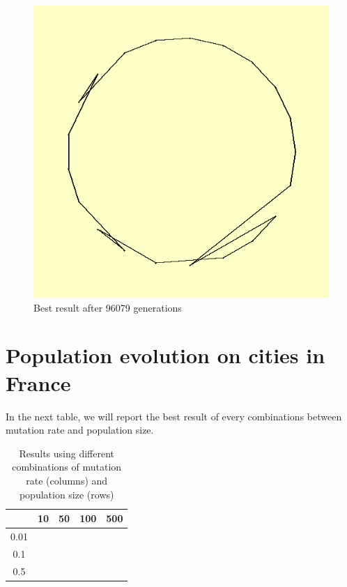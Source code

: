 \documentclass{article}
\begin{document}
\begin{figure}[!ht]
\includegraphics[width=\textwidth]{../result/exercise2/best.png}
\caption{Best result after 96079 generations}
\end{figure}

\newpage
\section{Population evolution on cities in France}
In the next table, we will report the best result of every combinations between mutation rate and population size.

\begin{table}
\centering
\caption{Results using different combinations of mutation rate (columns) and population size (rows)}
\begin{tabular}{c||c|c|c|c}
&10 & 50 & 100 & 500\\
\hline
0.01&&&&\\
\hline
0.1&&&&\\
\hline
0.5&&&&\\
\hline
\end{tabular}
\end{table}
\end{document}
